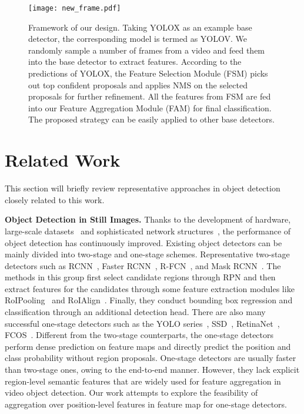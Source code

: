\documentclass[letterpaper]{article} \usepackage{aaai23}  \usepackage{times}  \usepackage{helvet}  \usepackage{courier}  \usepackage[hyphens]{url}  \usepackage{graphicx} \urlstyle{rm} \def\UrlFont{\rm}  \usepackage{natbib}  \usepackage{caption} \usepackage{xcolor}
\begin{document}
\begin{figure*}[t]
\centering
\texttt{[image: new\_frame.pdf]}
\caption{Framework of our design. Taking YOLOX as an example base detector, the corresponding model is termed as YOLOV. We randomly sample a number of frames from a video and feed them into the base detector to extract features. According to the predictions of YOLOX, the Feature Selection Module (FSM) picks out top  confident proposals and applies NMS on the selected proposals for further refinement. All the features from FSM are fed into our Feature Aggregation Module (FAM) for final classification. The proposed strategy can be easily applied to other base detectors.}
\label{fig:yolov}
\end{figure*}

\section{Related Work}
This section will briefly review representative approaches in object detection closely related to this work.

\noindent
\textbf{Object Detection in Still Images.} Thanks to the development of hardware, large-scale datasets~\cite{lin2014microsoft,krizhevsky2012imagenet} and sophisticated network structures~\cite{simonyan2014very,he2016deep,xie2017aggregated,wang2020cspnet}, the performance of object detection has continuously improved. Existing object detectors can be mainly divided into two-stage and one-stage schemes. Representative two-stage detectors such as RCNN~\cite{girshick2014rich}, Faster RCNN~\cite{ren2015faster}, R-FCN~\cite{dai2016r}, and Mask RCNN~\cite{he2017mask}. The methods in this group first select candidate regions through RPN and then extract features for the candidates through some feature extraction modules like RoIPooling~\cite{ren2015faster} and RoIAlign~\cite{he2017mask}. Finally, they conduct bounding box regression and classification through an additional detection head. There are also many successful one-stage detectors such as the YOLO series~\cite{redmon2016you,redmon2017yolo9000,bochkovskiy2020yolov4,ge2021yolox}, SSD~\cite{liu2016ssd}, RetinaNet~\cite{lin2017focal}, FCOS~\cite{tian2019fcos}. Different from the two-stage counterparts, the one-stage detectors perform dense prediction on feature maps and directly predict the position and class probability without region proposals.
One-stage detectors are usually faster than two-stage ones, owing to the end-to-end manner. However, they lack explicit region-level semantic features that are widely used for feature aggregation in video object detection. Our work attempts to explore the feasibility of aggregation over position-level features in feature map for one-stage detectors.
\end{document}
